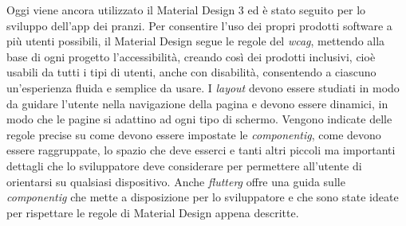 Oggi viene ancora utilizzato il Material Design 3 ed è stato seguito per lo sviluppo dell'app dei pranzi.\newline
\newline
Per consentire l'uso dei propri prodotti software a più utenti possibili, il Material Design segue le regole del \emph{\gls{wcag}}\glsfirstoccur, mettendo alla base di ogni progetto l'accessibilità, creando così dei prodotti inclusivi, cioè usabili da tutti i tipi di utenti, anche con disabilità, consentendo a ciascuno un'esperienza fluida e semplice da usare.\newline
\newline
I \emph{layout} devono essere studiati in modo da guidare l'utente nella navigazione della pagina e devono essere dinamici, in modo che le pagine si adattino ad ogni tipo di schermo.\newline
Vengono indicate delle regole precise su come devono essere impostate le \emph{\gls{componentig}}\glsfirstoccur, come devono essere raggruppate, lo spazio che deve esserci e tanti altri piccoli ma importanti dettagli che lo sviluppatore deve considerare per permettere all'utente di orientarsi su qualsiasi dispositivo.\newline
Anche \emph{\gls{flutterg}} offre una guida sulle \emph{\gls{componentig}} che mette a disposizione per lo sviluppatore e che sono state ideate per rispettare le regole di Material Design appena descritte.\newline

